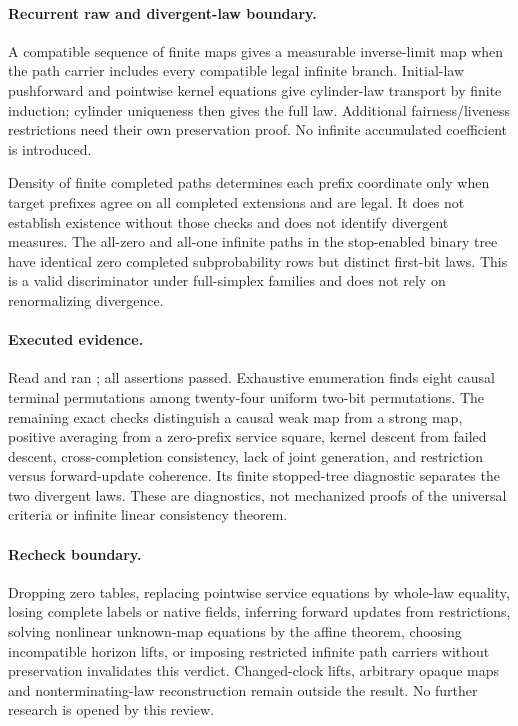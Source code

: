 \documentclass{article}
\begin{document}
\paragraph{Recurrent raw and divergent-law boundary.}
A compatible sequence of finite maps gives a measurable inverse-limit map when the path carrier includes every compatible legal infinite branch. Initial-law pushforward and pointwise kernel equations give cylinder-law transport by finite induction; cylinder uniqueness then gives the full law. Additional fairness/liveness restrictions need their own preservation proof. No infinite accumulated coefficient is introduced.

Density of finite completed paths determines each prefix coordinate only when target prefixes agree on all completed extensions and are legal. It does not establish existence without those checks and does not identify divergent measures. The all-zero and all-one infinite paths in the stop-enabled binary tree have identical zero completed subprobability rows but distinct first-bit laws. This is a valid discriminator under full-simplex families and does not rely on renormalizing divergence.

\paragraph{Executed evidence.}
Read and ran ; all assertions passed. Exhaustive enumeration finds eight causal terminal permutations among twenty-four uniform two-bit permutations. The remaining exact checks distinguish a causal weak map from a strong map, positive averaging from a zero-prefix service square, kernel descent from failed descent, cross-completion consistency, lack of joint generation, and restriction versus forward-update coherence. Its finite stopped-tree diagnostic separates the two divergent laws. These are diagnostics, not mechanized proofs of the universal criteria or infinite linear consistency theorem.

\paragraph{Recheck boundary.}
Dropping zero tables, replacing pointwise service equations by whole-law equality, losing complete labels or native fields, inferring forward updates from restrictions, solving nonlinear unknown-map equations by the affine theorem, choosing incompatible horizon lifts, or imposing restricted infinite path carriers without preservation invalidates this verdict. Changed-clock lifts, arbitrary opaque maps and nonterminating-law reconstruction remain outside the result. No further research is opened by this review.
\end{document}
